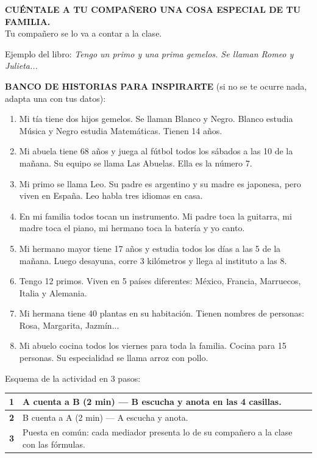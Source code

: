 \documentclass[a4paper,11pt]{article}
\begin{document}
\begin{center}
{\Large\textbf{CUÉNTALE A TU COMPAÑERO UNA COSA ESPECIAL DE TU FAMILIA.}}\\[0.2cm]
{\large Tu compañero se lo va a contar a la clase.}
\end{center}

\vspace{0.3cm}

Ejemplo del libro: \textit{Tengo un primo y una prima gemelos. Se llaman Romeo y Julieta...}

\vspace{0.3cm}

\noindent\colorbox{gris}{\parbox{\dimexpr\linewidth-2\fboxsep}{%
\textbf{BANCO DE HISTORIAS PARA INSPIRARTE} (si no se te ocurre nada, adapta una con tus datos):\\[0.2cm]
\begin{enumerate}[leftmargin=1cm, itemsep=2pt]
\item Mi tía tiene dos hijos gemelos. Se llaman Blanco y Negro. Blanco estudia Música y Negro estudia Matemáticas. Tienen 14 años.
\item Mi abuela tiene 68 años y juega al fútbol todos los sábados a las 10 de la mañana. Su equipo se llama Las Abuelas. Ella es la número 7.
\item Mi primo se llama Leo. Su padre es argentino y su madre es japonesa, pero viven en España. Leo habla tres idiomas en casa.
\item En mi familia todos tocan un instrumento. Mi padre toca la guitarra, mi madre toca el piano, mi hermano toca la batería y yo canto.
\item Mi hermano mayor tiene 17 años y estudia todos los días a las 5 de la mañana. Luego desayuna, corre 3 kilómetros y llega al instituto a las 8.
\item Tengo 12 primos. Viven en 5 países diferentes: México, Francia, Marruecos, Italia y Alemania.
\item Mi hermana tiene 40 plantas en su habitación. Tienen nombres de personas: Rosa, Margarita, Jazmín...
\item Mi abuelo cocina todos los viernes para toda la familia. Cocina para 15 personas. Su especialidad se llama arroz con pollo.
\end{enumerate}
}}

\vspace{0.3cm}

Esquema de la actividad en 3 pasos:

\begin{center}
\renewcommand{\arraystretch}{1.5}
\begin{tabular}{|>{\centering\arraybackslash}p{1cm}|>{\raggedright\arraybackslash}p{11cm}|}
\hline
\rowcolor{verde!15}
\textbf{1} & A cuenta a B (2 min) — B escucha y anota en las 4 casillas. \\
\hline
\textbf{2} & B cuenta a A (2 min) — A escucha y anota. \\
\hline
\rowcolor{violeta!10}
\textbf{3} & Puesta en común: cada mediador presenta lo de su compañero a la clase con las fórmulas. \\
\hline
\end{tabular}
\end{center}
\end{document}
